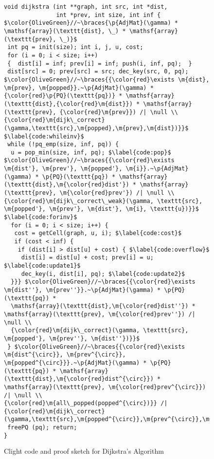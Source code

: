 
\begin{figure}[t]

\begin{lstlisting}[mathescape=true,showlines=true]
void dijkstra (int **graph, int src, int *dist, 
               int *prev, int size, int inf {
$\color{OliveGreen}//~\braces{\p{AdjMat}(\gamma) *
\mathsf{array}(\texttt{dist}, \_) * \mathsf{array}(\texttt{prev}, \_)}$
 int pq = init(size); int i, j, u, cost;
 for (i = 0; i < size; i++)
 {  dist[i] = inf; prev[i] = inf; push(i, inf, pq);  }
 dist[src] = 0; prev[src] = src; dec_key(src, 0, pq);
$\color{OliveGreen}//~\braces{{\color{red}\exists \m{dist}, \m{prev}, \m{popped}}.~\p{AdjMat}(\gamma) * {\color{red}\p{PQ}(\texttt{pq})} * \mathsf{array}(\texttt{dist},{\color{red}\m{dist}}) * \mathsf{array}(\texttt{prev}, {\color{red}\m{prev}}) /| \null \\
{\color{red}\m{dijk\_correct}(\gamma,\texttt{src},\m{popped},\m{prev},\m{dist})}}$ $\label{code:whileinv}$
 while (!pq_emp(size, inf, pq)) {
  u = pop_min(size, inf, pq); $\label{code:pop}$
$\color{OliveGreen}//~\braces{{\color{red}\exists \m{dist'}, \m{prev'}, \m{popped'}, \m{i}}.~\p{AdjMat}(\gamma) * \p{PQ}(\texttt{pq}) * \mathsf{array}(\texttt{dist},\m{\color{red}dist'}) * \mathsf{array}(\texttt{prev}, \m{\color{red}prev'}) /| \null \\
{\color{red}\m{dijk\_correct\_weak}(\gamma, \texttt{src}, \m{popped'}, \m{prev'}, \m{dist'}, \m{i}, \texttt{u})}}$ $\label{code:forinv}$
  for (i = 0; i < size; i++) {
   cost = getCell(graph, u, i); $\label{code:cost}$
   if (cost < inf) {
    if (dist[i] > dist[u] + cost) { $\label{code:overflow}$
     dist[i] = dist[u] + cost; prev[i] = u; $\label{code:update1}$ 
     dec_key(i, dist[i], pq); $\label{code:update2}$
  }}} $\color{OliveGreen}//~\braces{{\color{red}\exists \m{dist''}, \m{prev''}}.~\p{AdjMat}(\gamma) * \p{PQ}(\texttt{pq}) *
  \mathsf{array}(\texttt{dist},\m{\color{red}dist''}) * \mathsf{array}(\texttt{prev}, \m{\color{red}prev''}) /| \null \\
  {\color{red}\m{dijk\_correct}(\gamma, \texttt{src}, \m{popped'}, \m{prev''}, \m{dist''})}}$
 } $\color{OliveGreen}//~\braces{{\color{red}\exists \m{dist^{\circ}}, \m{prev^{\circ}}, \m{popped^{\circ}}}.~\p{AdjMat}(\gamma) * \p{PQ}(\texttt{pq}) * \mathsf{array}(\texttt{dist},\m{\color{red}dist^{\circ}}) * \mathsf{array}(\texttt{prev}, \m{\color{red}prev^{\circ}}) /| \null \\
{\color{red}\m{all\_popped(popped^{\circ})}} /|
{\color{red}\m{dijk\_correct}(\gamma,\texttt{src},\m{popped^{\circ}},\m{prev^{\circ}},\m{dist^{\circ}})}}$
 freePQ (pq); return; 
}
\end{lstlisting}
\vspace{-1em}
\caption{Clight code and proof sketch for Dijkstra's Algorithm}
\vspace{-1em}
\label{fig:decorated}
\end{figure} 